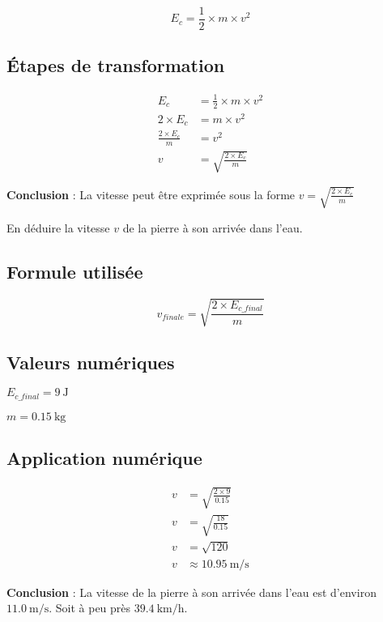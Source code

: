 \documentclass[answers]{exam}
\begin{document}
\begin{questions}
\begin{solution}
\[
E_c = \frac{1}{2} \times m \times v^2
\]

\subsection*{Étapes de transformation}
\begin{align*}
E_c &= \frac{1}{2} \times m \times v^2 \\
2 \times E_c &= m \times v^2 \\
\frac{2 \times E_c}{m} &= v^2 \\
v &= \sqrt{\frac{2 \times E_c}{m}}
\end{align*}

\textbf{Conclusion} : La vitesse peut être exprimée sous la forme \( v = \sqrt{\frac{2 \times E_c}{m}} \)
\end{solution}

\question[1] En déduire la vitesse $v$ de la pierre à son arrivée dans l'eau.

\begin{solution}

\subsection*{Formule utilisée}
\[
v_{finale} = \sqrt{\frac{2 \times E_{c\_final}}{m}}
\]

\subsection*{Valeurs numériques}
\begin{compactitem}
  \item \( E_{c\_final} = \qty{9}{\J} \)
  \item \( m = \qty{0.15}{\kg} \)
\end{compactitem}

\subsection*{Application numérique}
\begin{align*}
v &= \sqrt{\frac{2 \times 9}{0.15}} \\
v &= \sqrt{\frac{18}{0.15}} \\
v &= \sqrt{120} \\
v &\approx \qty{10.95}{\m\per\second}
\end{align*}

\textbf{Conclusion} : La vitesse de la pierre à son arrivée dans l’eau est d’environ \(\SI{11.0}{\meter\per\second}\). Soit à peu près $\qty{39.4}{\km\per\hour}$.
\end{solution}

\end{questions}
\end{document}
